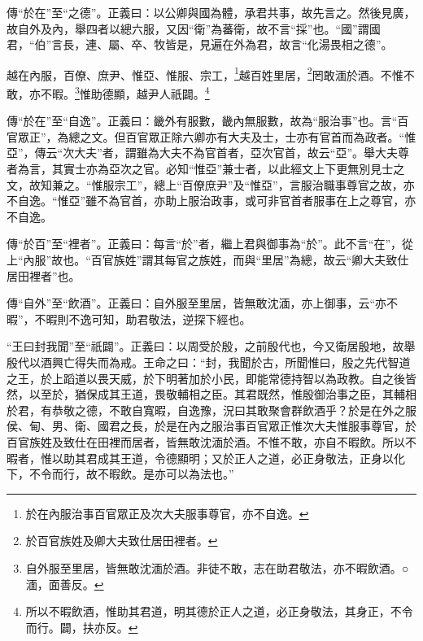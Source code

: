 {\noindent\zhuan{}\fzbyks 傳“於在”至“之德”。正義曰：以公卿與國為體，承君共事，故先言之。然後見廣，故自外及內，舉四者以總六服，又因“衛”為蕃衛，故不言“採”也。“國”謂國君，“伯”言長，連、屬、卒、牧皆是，見遍在外為君，故言“化湯畏相之德”。 \par}

越在內服，百僚、庶尹、惟亞、惟服、宗工，\footnote{於在內服治事百官眾正及次大夫服事尊官，亦不自逸。}越百姓里居，\footnote{於百官族姓及卿大夫致仕居田裡者。}罔敢湎於酒。不惟不敢，亦不暇。\footnote{自外服至里居，皆無敢沈湎於酒。非徒不敢，志在助君敬法，亦不暇飲酒。○湎，面善反。}惟助德顯，越尹人祇闢。\footnote{所以不暇飲酒，惟助其君道，明其德於正人之道，必正身敬法，其身正，不令而行。闢，扶亦反。}

{\noindent\zhuan{}\fzbyks 傳“於在”至“自逸”。正義曰：畿外有服數，畿內無服數，故為“服治事”也。言“百官眾正”，為總之文。但百官眾正除六卿亦有大夫及士，士亦有官首而為政者。“惟亞”，傳云“次大夫”者，謂雖為大夫不為官首者，亞次官首，故云“亞”。舉大夫尊者為言，其實士亦為亞次之官。必知“惟亞”兼士者，以此經文上下更無別見士之文，故知兼之。“惟服宗工”，總上“百僚庶尹”及“惟亞”，言服治職事尊官之故，亦不自逸。“惟亞”雖不為官首，亦助上服治政事，或可非官首者服事在上之尊官，亦不自逸。 \par}

{\noindent\zhuan{}\fzbyks 傳“於百”至“裡者”。正義曰：每言“於”者，繼上君與御事為“於”。此不言“在”，從上“內服”故也。“百官族姓”謂其每官之族姓，而與“里居”為總，故云“卿大夫致仕居田裡者”也。 \par}

{\noindent\zhuan{}\fzbyks 傳“自外”至“飲酒”。正義曰：自外服至里居，皆無敢沈湎，亦上御事，云“亦不暇”，不暇則不逸可知，助君敬法，逆探下經也。 \par}

{\noindent\shu{}\fzkt “王曰封我聞”至“祇闢”。正義曰：以周受於殷，之前殷代也，今又衛居殷地，故舉殷代以酒興亡得失而為戒。王命之曰：“封，我聞於古，所聞惟曰，殷之先代智道之王，於上蹈道以畏天威，於下明著加於小民，即能常德持智以為政教。自之後皆然，以至於，猶保成其王道，畏敬輔相之臣。其君既然，惟殷御治事之臣，其輔相於君，有恭敬之德，不敢自寬暇，自逸豫，況曰其敢聚會群飲酒乎？於是在外之服侯、甸、男、衛、國君之長，於是在內之服治事百官眾正惟次大夫惟服事尊官，於百官族姓及致仕在田裡而居者，皆無敢沈湎於酒。不惟不敢，亦自不暇飲。所以不暇者，惟以助其君成其王道，令德顯明；又於正人之道，必正身敬法，正身以化下，不令而行，故不暇飲。是亦可以為法也。” \par}

